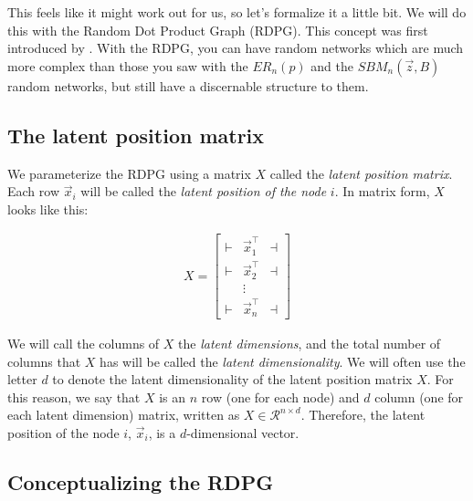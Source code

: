This feels like it might work out for us, so let's formalize it a little bit. We will do this with the Random Dot Product Graph (RDPG). This concept was first introduced by \cite{Young2007}. With the RDPG, you can have random networks which are much more complex than those you saw with the $ER_n(p)$ and the $SBM_n(\vec z, B)$ random networks, but {still} have a discernable structure to them.


\subsection{The latent position matrix}

We parameterize the RDPG using a matrix $X$ called the \textit{latent position matrix}. Each row $\vec x_i$ will be called the \textit{latent position of the node} $i$. In matrix form, $X$ looks like this:

\begin{align*}
 X = \begin{bmatrix}
     \vdash & \vec x_1^\top & \dashv \\
     \vdash & \vec x_2^\top & \dashv \\
     & \vdots & \\
     \vdash & \vec x_n^\top & \dashv
 \end{bmatrix}
\end{align*}

We will call the columns of $X$ the \textit{latent dimensions}, and the total number of columns that $X$ has will be called the \textit{latent dimensionality}. We will often use the letter $d$ to denote the latent dimensionality of the latent position matrix $X$. For this reason, we say that $X$ is an $n$ row (one for each node) and $d$ column (one for each latent dimension) matrix, written as $X \in \mathcal{R}^{n \times d}$. Therefore, the latent position of the node $i$, $\vec x_i$, is a $d$-dimensional vector. 


\subsection{Conceptualizing the RDPG}

